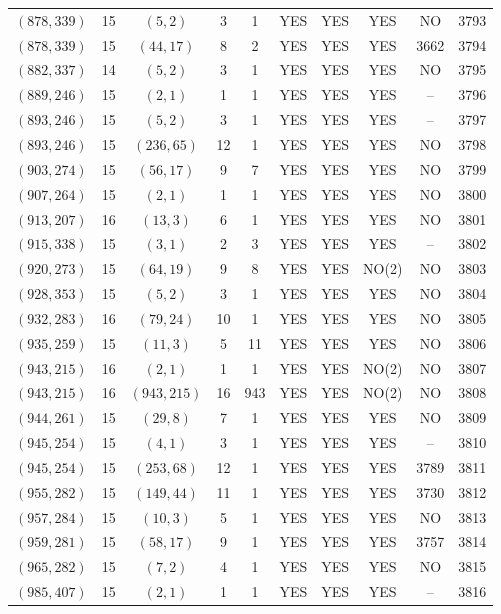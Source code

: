 \begin{longtable}{|c|c|c|c|c|c|c|c|c|c|}
$(878, 339)$ & 15 & $(5, 2)$ & 3 & 1 & YES & YES & YES & NO & 3793\\
$(878, 339)$ & 15 & $(44, 17)$ & 8 & 2 & YES & YES & YES & 3662 & 3794\\
$(882, 337)$ & 14 & $(5, 2)$ & 3 & 1 & YES & YES & YES & NO & 3795\\
$(889, 246)$ & 15 & $(2, 1)$ & 1 & 1 & YES & YES & YES & -- & 3796\\
$(893, 246)$ & 15 & $(5, 2)$ & 3 & 1 & YES & YES & YES & -- & 3797\\
$(893, 246)$ & 15 & $(236, 65)$ & 12 & 1 & YES & YES & YES & NO & 3798\\
$(903, 274)$ & 15 & $(56, 17)$ & 9 & 7 & YES & YES & YES & NO & 3799\\
$(907, 264)$ & 15 & $(2, 1)$ & 1 & 1 & YES & YES & YES & NO & 3800\\
$(913, 207)$ & 16 & $(13, 3)$ & 6 & 1 & YES & YES & YES & NO & 3801\\
$(915, 338)$ & 15 & $(3, 1)$ & 2 & 3 & YES & YES & YES & -- & 3802\\
$(920, 273)$ & 15 & $(64, 19)$ & 9 & 8 & YES & YES & NO(2) & NO & 3803\\
$(928, 353)$ & 15 & $(5, 2)$ & 3 & 1 & YES & YES & YES & NO & 3804\\
$(932, 283)$ & 16 & $(79, 24)$ & 10 & 1 & YES & YES & YES & NO & 3805\\
$(935, 259)$ & 15 & $(11, 3)$ & 5 & 11 & YES & YES & YES & NO & 3806\\
$(943, 215)$ & 16 & $(2, 1)$ & 1 & 1 & YES & YES & NO(2) & NO & 3807\\
$(943, 215)$ & 16 & $(943, 215)$ & 16 & 943 & YES & YES & NO(2) & NO & 3808\\
$(944, 261)$ & 15 & $(29, 8)$ & 7 & 1 & YES & YES & YES & NO & 3809\\
$(945, 254)$ & 15 & $(4, 1)$ & 3 & 1 & YES & YES & YES & -- & 3810\\
$(945, 254)$ & 15 & $(253, 68)$ & 12 & 1 & YES & YES & YES & 3789 & 3811\\
$(955, 282)$ & 15 & $(149, 44)$ & 11 & 1 & YES & YES & YES & 3730 & 3812\\
$(957, 284)$ & 15 & $(10, 3)$ & 5 & 1 & YES & YES & YES & NO & 3813\\
$(959, 281)$ & 15 & $(58, 17)$ & 9 & 1 & YES & YES & YES & 3757 & 3814\\
$(965, 282)$ & 15 & $(7, 2)$ & 4 & 1 & YES & YES & YES & NO & 3815\\
$(985, 407)$ & 15 & $(2, 1)$ & 1 & 1 & YES & YES & YES & -- & 3816\\

\end{longtable}
